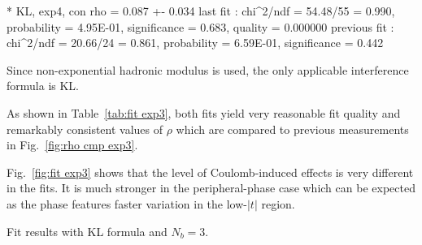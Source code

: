 * KL, exp4, con
rho    =   0.087 +-  0.034
last fit     : chi^2/ndf = 54.48/55 = 0.990, probability = 4.95E-01, significance = 0.683, quality = 0.000000
previous fit : chi^2/ndf = 20.66/24 = 0.861, probability = 6.59E-01, significance = 0.442
\fi

Since non-exponential hadronic modulus is used, the only applicable interference formula is KL.

As shown in Table~\ref{tab:fit exp3}, both fits yield very reasonable fit quality and remarkably consistent values of $\rho$ which are compared to previous measurements in Fig.~\ref{fig:rho cmp exp3}.

Fig.~\ref{fig:fit exp3} shows that the level of Coulomb-induced effects is very different in the fits. It is much stronger in the peripheral-phase case which can be expected as the phase features faster variation in the low-$|t|$ region.


\begin{table}
\caption{Fit results with KL formula and $N_b=3$.}
\vskip-3mm
\label{tab:fit exp3}
\begin{center}
\setlength\tabcolsep{5mm}
\small

\end{center}
\end{table}

